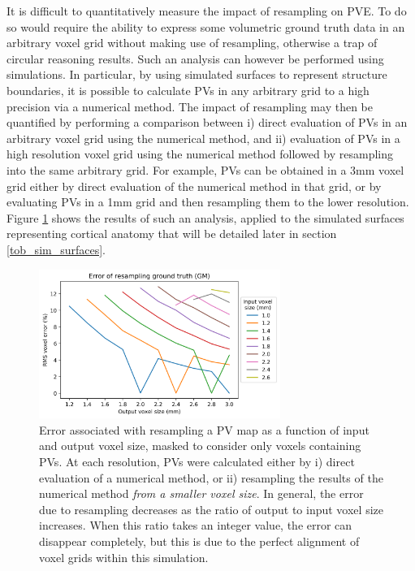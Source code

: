 \documentclass[12pt]{report}
\begin{document}
It is difficult to quantitatively measure the impact of resampling on PVE. To do so would require the ability to express some volumetric ground truth data in an arbitrary voxel grid without making use of resampling, otherwise a trap of circular reasoning results. Such an analysis can however be performed using simulations. In particular, by using simulated surfaces to represent structure boundaries, it is possible to calculate PVs in any arbitrary grid to a high precision via a numerical method. The impact of resampling may then be quantified by performing a comparison between i) direct evaluation of PVs in an arbitrary voxel grid using the numerical method, and ii) evaluation of PVs in a high resolution voxel grid using the numerical method followed by resampling into the same arbitrary grid. For example, PVs can be obtained in a 3mm voxel grid either by direct evaluation of the numerical method in that grid, or by evaluating PVs in a 1mm grid and then resampling them to the lower resolution. Figure \ref{resamp_ratio} shows the results of such an analysis, applied to the simulated surfaces representing cortical anatomy that will be detailed later in section \ref{tob_sim_surfaces}. 

\begin{figure}
\centering
\includegraphics[width = 0.7\textwidth]{resamp_ratio.png}
\caption{Error associated with resampling a PV map as a function of input and output voxel size, masked to consider only voxels containing PVs. At each resolution, PVs were calculated either by i) direct evaluation of a numerical method, or ii) resampling the results of the numerical method \textit{from a smaller voxel size}. In general, the error due to resampling decreases as the ratio of output to input voxel size increases. When this ratio takes an integer value, the error can disappear completely, but this is due to the perfect alignment of voxel grids within this simulation.}
\label{resamp_ratio}
\end{figure}
\end{document}
